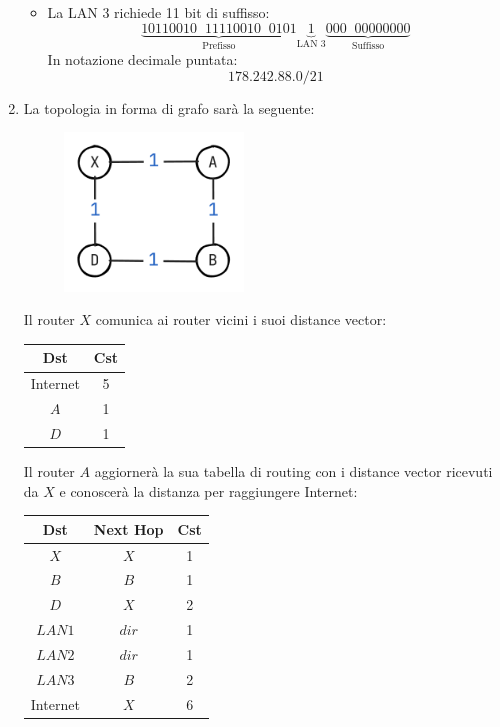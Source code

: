 \documentclass[a4paper]{article}
\begin{document}
\begin{enumerate}
\begin{itemize}
    \item La LAN 3 richiede 11 bit di suffisso:
      \[
        \underbrace{10110010 \;\; 11110010 \;\; 0101}_{\text{Prefisso}}
        \underbrace{1}_{\text{LAN 3}}
        \underbrace{000 \;\; 00000000}_{\text{Suffisso}}
      \]
      In notazione decimale puntata:
      \[
      178.242.88.0/21
      \] 
  \end{itemize}

\item 
  La topologia in forma di grafo sarà la seguente:
  \begin{figure}[H]
    \centering
    \includegraphics[width=0.45\textwidth]{../figures/esercitazione-es7-2-tcp}
  \end{figure}
  \noindent
  Il router \( X \) comunica ai router vicini i suoi distance vector:
  \begin{table}[H]
    \centering
    \begin{tabular}{c|c}
      \textbf{Dst} & \textbf{Cst}\\
      \hline
      Internet & 5\\
      \( A \) & 1\\
      \( D \) & 1\\
    \end{tabular}
  \end{table}
  \noindent
  Il router \( A \) aggiornerà la sua tabella di routing con i distance vector ricevuti
  da \( X \) e conoscerà la distanza per raggiungere Internet:
  \begin{table}[H]
    \centering
    \begin{tabular}{c|c|c}
      \textbf{Dst} & \textbf{Next Hop} & \textbf{Cst}\\
      \hline
      \( X \) & \( X \) & 1\\
      \( B \) & \( B \) & 1\\
      \( D \) & \( X \) & 2\\
      \( LAN1 \) & \( dir \) & 1\\
      \( LAN2 \) & \( dir \) & 1\\ 
      \( LAN3 \) & \( B \) & 2\\
      Internet & \( X \) & 6\\
    \end{tabular}
  \end{table}

\end{enumerate}
\end{document}
